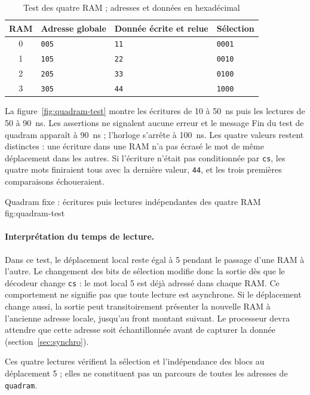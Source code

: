 \begin{table}[H]
\centering
\begin{tabular}{clll}
\toprule
RAM & Adresse globale & Donnée écrite et relue & Sélection \\
\midrule
0 & \texttt{005} & \texttt{11} & \texttt{0001} \\
1 & \texttt{105} & \texttt{22} & \texttt{0010} \\
2 & \texttt{205} & \texttt{33} & \texttt{0100} \\
3 & \texttt{305} & \texttt{44} & \texttt{1000} \\
\bottomrule
\end{tabular}
\caption{Test des quatre RAM ; adresses et données en hexadécimal}
\label{tab:quadram-test}
\end{table}

La figure~\ref{fig:quadram-test} montre les écritures de 10 à 50~ns puis les lectures de
50 à 90~ns. Les assertions ne signalent aucune erreur et le message
\og Fin du test de quadram\fg{} apparaît à 90~ns ; l'horloge s'arrête à 100~ns. Les quatre
valeurs restent distinctes : une écriture dans une RAM n'a pas écrasé le mot de même
déplacement dans les autres. Si l'écriture n'était pas conditionnée par \texttt{cs}, les
quatre mots finiraient tous avec la dernière valeur, \texttt{44}, et les trois premières
comparaisons échoueraient.

{Quadram fixe : écritures puis lectures indépendantes des quatre RAM}
{fig:quadram-test}

\paragraph{Interprétation du temps de lecture.}
Dans ce test, le déplacement local reste égal à 5 pendant le passage d'une RAM à l'autre.
Le changement des bits de sélection modifie donc la sortie dès que le décodeur change
\texttt{cs} : le mot local 5 est déjà adressé dans chaque RAM. Ce comportement ne signifie
pas que toute lecture est asynchrone. Si le déplacement change aussi, la sortie peut
transitoirement présenter la nouvelle RAM à l'ancienne adresse locale, jusqu'au front
montant suivant. Le processeur devra attendre que cette adresse soit échantillonnée avant
de capturer la donnée (section~\ref{sec:synchro}).

Ces quatre lectures vérifient la sélection et l'indépendance des blocs au déplacement 5 ;
elles ne constituent pas un parcours de toutes les adresses de \texttt{quadram}.

